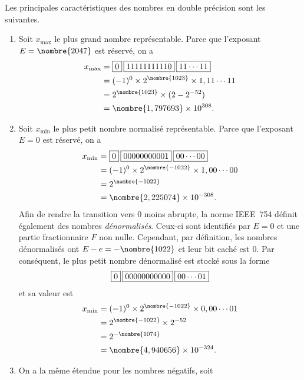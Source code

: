 \documentclass[letterpaper,11pt,english,french]{memoir}
\theoremstyle{plain}
\theoremstyle{definition}
\theoremstyle{remark}
\newcommand{\ieee}[3]{\fbox{$#1$}\hspace{2pt}\fbox{$#2$}\hspace{2pt}\fbox{$#3$}}
\begin{document}
Les principales caractéristiques des nombres en double précision sont
les suivantes.
\begin{enumerate}
\item Soit $x_{\text{max}}$ le plus grand nombre représentable. Parce
  que l'exposant $E = \nombre{2047}$ est réservé, on a
  \begin{align*}
    x_{\text{max}}
    &= \ieee{0}{11111111110}{11 \cdots 11} \\
    &= (-1)^0 \times 2^{\nombre{1023}} \times 1,11\cdots11 \\
    &= 2^{\nombre{1023}} \times (2 - 2^{-52}) \\
    &= \nombre{1,797693} \times 10^{308}.
  \end{align*}
\item Soit $x_{\text{min}}$ le plus petit nombre normalisé
  représentable. Parce que l'exposant $E = 0$ est réservé, on a
  \begin{align*}
    x_{\text{min}}
    &= \ieee{0}{00000000001}{00 \cdots 00} \\
    &= (-1)^0 \times 2^{\nombre{-1022}} \times 1,00\cdots00 \\
    &= 2^{\nombre{-1022}} \\
    &= \nombre{2,225074} \times 10^{-308}.
  \end{align*}
  Afin de rendre la transition vers $0$ moins abrupte, la norme
  IEEE~754 définit également des nombres \emph{dénormalisés}. Ceux-ci
  sont identifiés par $E = 0$ et une partie fractionnaire $F$ non
  nulle. Cependant, par définition, les nombres dénormalisés ont $E -
  e = -\nombre{1022}$ et leur bit caché est $0$. Par conséquent, le
  plus petit nombre dénormalisé est stocké sous la forme
  \begin{equation*}
    \ieee{0}{00000000000}{00 \cdots 01}
  \end{equation*}
  et sa valeur est
  \begin{align*}
    x_{\text{min}}
    &= (-1)^0 \times 2^{\nombre{-1022}} \times 0,00\cdots01 \\
    &= 2^{\nombre{-1022}} \times 2^{-52} \\
    &= 2^{-\nombre{1074}} \\
    &= \nombre{4,940656} \times 10^{-324}.
  \end{align*}
\item On a la même étendue pour les nombres négatifs, soit
  \begin{gather*}
    [\nombre{-1,797693} \times 10^{308},\,
     \nombre{-2,225074} \times 10^{-308}] \\

\end{gather*}
\end{enumerate}
\end{document}
